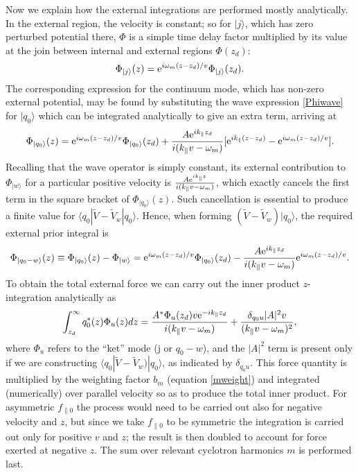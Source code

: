 \documentclass{jpp}
\def\ket#1{|#1\rangle}
\def\bra#1{\langle#1}
\def\etothe#1{{\rm e}^{#1}}
\begin{document}
Now we explain how the external integrations are performed mostly
analytically.  In the external region, the velocity is constant; so
for $\ket{j}$, which has zero perturbed potential there, $\Phi$ is a
simple time delay factor multiplied by its value at the join between internal
and external regions $\Phi(z_d)$:
\begin{equation}
  \label{phi4}
  \Phi_{\ket{j}}(z)=\etothe{i\omega_m(z-z_d)/v}   \Phi_{\ket{j}}(z_d).
\end{equation}
The corresponding expression for the continuum mode, which has
non-zero external potential, may be
found by substituting the wave expression \ref{Phiwave} for  $\ket{q_0}$
which can be integrated analytically to give an extra term, arriving
at
\begin{equation}
  \label{phiq}
  \Phi_{\ket{q_0}}(z)=\etothe{i\omega_m(z-z_d)/v}   \Phi_{\ket{q_0}}(z_d)
  +{A\etothe{ik_\parallel z_d}\over i(k_\parallel v-\omega_m)}[\etothe{ik_\parallel(z-z_d)}
  -\etothe{i\omega_m(z-z_d)/v}].
\end{equation}
Recalling that the wave operator is simply constant, its external
contribution to $\Phi_{\ket{w}}$ for a particular positive velocity is
${A\etothe{ik_\parallel z}\over i(k_\parallel v-\omega_m)}$, which
exactly cancels the first term in the square bracket of
$\Phi_{\ket{q_0}}(z)$. Such cancellation is essential to produce a
finite value for $\bra{q_0}|\tilde V -\tilde V_w\ket{q_0}$. Hence,
when forming
$(\tilde V -\tilde V_w)\ket{q_0}$, the required external prior
integral is
\begin{equation}
  \label{phidiff}
  \Phi_{\ket{q_0-w}}(z)\equiv \Phi_{\ket{q_0}}(z)-\Phi_{\ket{w}}
  =\etothe{i\omega_m(z-z_d)/v}   \Phi_{\ket{q_0}}(z_d)
  -{A\etothe{ik_\parallel z_d}\over i(k_\parallel v-\omega_m)}
  \etothe{i\omega_m(z-z_d)/v}.
\end{equation}
To obtain the total external force we can carry out the inner product
$z$-integration analytically as
\begin{equation}
  \label{extforce}
  \int_{z_d}^\infty q_0^*(z) \Phi_u(z)  dz =
  {A^*\Phi_u(z_d)v\etothe{-ik_\parallel z_d}\over i(k_\parallel  v-\omega_m)}
  + {\delta_{q_0u}|A|^2v\over (k_\parallel v-\omega_m)^2},
\end{equation}
where $\Phi_u$ refers to the ``ket'' mode (j or $q_0-w$), and the
$|A|^2$ term is present only if we are constructing
$\bra{q_0}|\tilde V -\tilde V_w)\ket{q_0}$, as indicated by
$\delta_{q_0u}$. This force quantity is multiplied by the
weighting factor $b_m$ (equation \ref{mweight}) and integrated
(numerically) over parallel velocity so as to produce the total inner
product. For asymmetric $f_{\parallel0}$ the process would need to be
carried out also for negative velocity and $z$, but since we take
$f_{\parallel0}$ to be symmetric the integration is carried out only
for positive $v$ and $z$; the result is then doubled to account for
force exerted at negative $z$. The sum over relevant cyclotron
harmonics $m$ is performed last.
\end{document}
